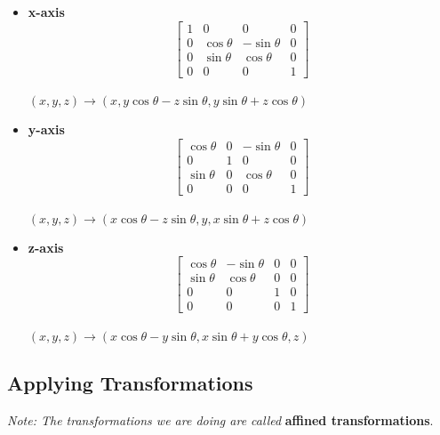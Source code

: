 \documentclass[11pt,fleqn]{article}
\theoremstyle{definition}
\begin{document}
\begin{itemize}
    \item \textbf{x-axis} \\
        \[
            \begin{bmatrix}
                1 & 0 & 0 & 0 \\
                0 & \cos\theta & -\sin\theta & 0 \\
                0 & \sin\theta & \cos\theta & 0 \\
                0 & 0 & 0 & 1
            \end{bmatrix}
        \] \\
        $(x,y,z) \rightarrow (x, y\cos\theta - z\sin\theta, y\sin\theta + z\cos\theta)$

    \item \textbf{y-axis} \\
        \[
            \begin{bmatrix}
                \cos\theta & 0 & -\sin\theta & 0 \\
                0 & 1 & 0 & 0 \\
                \sin\theta & 0 & \cos\theta & 0 \\
                0 & 0 & 0 & 1
            \end{bmatrix}
        \]\\
        $(x,y,z) \rightarrow (x\cos\theta - z\sin\theta, y, x\sin\theta + z\cos\theta)$

    \item \textbf{z-axis} \\
        \[
            \begin{bmatrix}
                \cos\theta & -\sin\theta & 0 & 0 \\
                \sin\theta & \cos\theta & 0 & 0 \\
                0 & 0 & 1 & 0 \\
                0 & 0 & 0 & 1
            \end{bmatrix}
        \]\\
        $(x,y,z) \rightarrow (x\cos\theta - y\sin\theta, x\sin\theta + y\cos\theta, z)$
\end{itemize}

\subsection{Applying Transformations}

\textit{Note: The transformations we are doing are called} \textbf{affined
transformations}.
\end{document}
